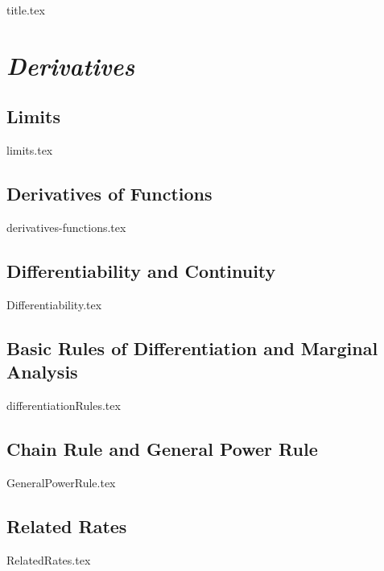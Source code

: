 \documentclass[11pt,a4paper,oneside]{book}
\theoremstyle{definition}%
\begin{document}
\frontmatter
{title.tex}

\clearpage
\thispagestyle{empty}

\tableofcontents

\mainmatter
\part{\emph{Derivatives}}
\newpage

\chapter{Limits }\label{limits}
{limits.tex}
\vspace{-0.3in}

\chapter{Derivatives of Functions}\label{introDerv}
{derivatives-functions.tex}

\chapter{Differentiability and Continuity}\label{differentiability}
{Differentiability.tex}

\chapter{Basic Rules of Differentiation and Marginal Analysis}\label{diffRules}
{differentiationRules.tex}

\chapter{Chain Rule and General Power Rule}\label{GenPower}
{GeneralPowerRule.tex}

\chapter{Related Rates}\label{RelatedRates}
{RelatedRates.tex}
\end{document}
